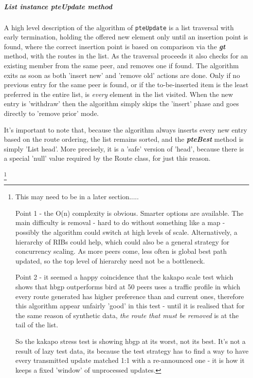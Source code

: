 \subparagraph{List instance pteUpdate method}
A high level description of the algorithm of \lstinline|pteUpdate| is a list traversal with early termination, holding the offered new element only until an insertion point is found, where the correct insertion point is based on comparison via the \textbf{\textit{gt}} method, with the routes in the list.  As the traversal proceeds it also checks for an existing member from the same peer, and removes one if found.  The algorithm exits as soon as both 'insert new' and 'remove old' actions are done.  Only if no previous entry for the same peer is found, or if the to-be-inserted item is the least preferred in the entire list, is \textit{every} element in the list visited.  When the new entry is 'withdraw' then the algorithm simply skips the 'insert' phase and goes directly to 'remove prior' mode.

It's important to note that, because the algorithm always inserts every new entry based on the route ordering, the list remains sorted, and the \textit{\textbf{pteBest}} method is simply 'List head'.  More precisely, it is a 'safe' version of 'head', because there is a special 'null' value required by the Route class, for just this reason.

\footnote{This may need to be in a later section.....

Point 1 - the O(n) complexity is obvious.  Smarter options are available.  The main difficulty is removal - hard to do without something like a map - possibly the algorithm could switch at high levels of scale.  Alternatively, a hierarchy of RIBs could help, which could also be a general strategy for concurrency scaling.  As more peers come, less often is global best path updated, so the top level of hierarchy need not be a bottleneck.

Point 2 - it seemed a happy coincidence that the kakapo scale test which shows that hbgp outperforms bird at 50 peers uses a traffic profile in which every route generated has higher preference than and current ones, therefore this algorithm appear unfairly 'good' in this test - until it is realised that for the same reason of synthetic data, \textit{the route that must be removed} is at the tail of the list.

So the kakapo stress test is showing hbgp at its worst, not its best.
It's not a result of lazy test data, its because the test strategy has to find a way to have every transmitted update matched 1:1 with a re-announced one - it is how it keeps a fixed 'window' of unprocessed updates.
}

